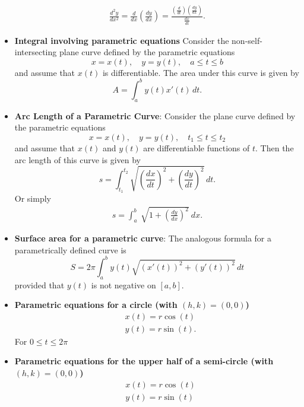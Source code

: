 \documentclass{report}
\begin{document}
\begin{itemize}
            \begin{align*}
                \frac{d^{2}y}{dx^{2}} = \frac{d}{dx}\left(\frac{dy}{dx}\right) = \frac{\left(\frac{d}{dt}\right)\left(\frac{dy}{dx}\right)}{\frac{dx}{dt}}
            .\end{align*}
        \item \textbf{Integral involving parametric equations}
            Consider the non-self-intersecting plane curve defined by the parametric equations
            \[
                x = x(t), \quad y = y(t), \quad a \leq t \leq b
            \]
            and assume that \( x(t) \) is differentiable. The area under this curve is given by
            \[
                A = \int_{a}^{b} y(t) x'(t) \, dt.
            \]
        \item \textbf{Arc Length of a Parametric Curve}:
            Consider the plane curve defined by the parametric equations
            \[
                x = x(t), \quad y = y(t), \quad t_1 \leq t \leq t_2
            \]
            and assume that \( x(t) \) and \( y(t) \) are differentiable functions of \( t \). Then the arc length of this curve is given by
            \[
                s = \int_{t_1}^{t_2} \sqrt{\left(\frac{dx}{dt}\right)^2 + \left(\frac{dy}{dt}\right)^2} \, dt.
            \]
            Or simply
            \begin{align*}
                s = \int_{a}^{b}\ \sqrt{1 + \left(\frac{dy}{dx}\right)^{2}}\ dx
            .\end{align*}
        \item \textbf{Surface area for a parametric curve}:
            The analogous formula for a parametrically defined curve is
            \[
                S = 2\pi \int_{a}^{b} y(t) \sqrt{(x'(t))^2 + (y'(t))^2} \, dt
            \]
            provided that \( y(t) \) is not negative on \([a, b]\).
        \item \textbf{Parametric equations for a circle (with $(h,k) = (0,0)$)}
            \begin{align*}
                &x(t) = r\cos{(t)} \\
                &y(t) = r\sin{(t)}
            .\end{align*}
            For $0 \leq t \leq 2\pi $
        \item \textbf{Parametric equations for the upper half of a semi-circle (with $(h,k) = (0,0)$)}
            \begin{align*}
                &x(t) = r\cos{(t)} \\
                &y(t) = r\sin{(t)}

\end{align*}
\end{itemize}
\end{document}
